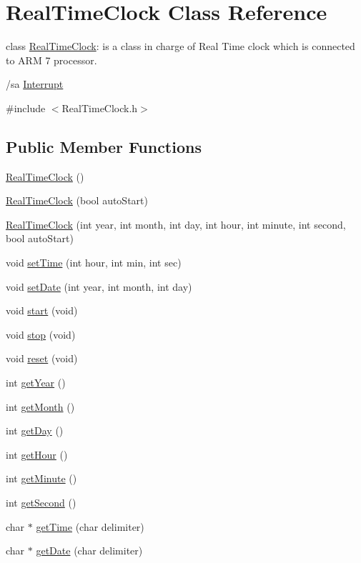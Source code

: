 \hypertarget{class_real_time_clock}{
\section{RealTimeClock Class Reference}
\label{class_real_time_clock}
}


class \hyperlink{class_real_time_clock}{RealTimeClock}: is a class in charge of Real Time clock which is connected to ARM 7 processor.

/sa \hyperlink{class_interrupt}{Interrupt}  




{\ttfamily \#include $<$RealTimeClock.h$>$}

\subsection*{Public Member Functions}
\begin{DoxyCompactItemize}
\item 
\hyperlink{class_real_time_clock_ad4fb1eea4450089f13ae70650e5d2d1c}{RealTimeClock} ()
\item 
\hyperlink{group__group9_ga02c3e799d7541e2917ef46e71146ed90}{RealTimeClock} (bool autoStart)
\item 
\hyperlink{group__group9_gaad2bfb64a40a2a2729b569c08e7dcc49}{RealTimeClock} (int year, int month, int day, int hour, int minute, int second, bool autoStart)
\item 
void \hyperlink{group__group9_ga14ecce7648b24c7a85359af3f5b20af6}{setTime} (int hour, int min, int sec)
\item 
void \hyperlink{group__group9_ga4a5781efbfce128e0d3c461627ce371b}{setDate} (int year, int month, int day)
\item 
void \hyperlink{group__group9_gab62814ef94d0fe081e1f8a2756317a3c}{start} (void)
\item 
void \hyperlink{group__group9_ga116ebd0f42df71ef71d217527194d867}{stop} (void)
\item 
void \hyperlink{group__group9_ga81b09971229ddc88a7581bf5dcab7d1e}{reset} (void)
\item 
int \hyperlink{group__group9_ga58d426541706593b83016e0462e41625}{getYear} ()
\item 
int \hyperlink{group__group9_gaa8901871334c623b9473216de08c1432}{getMonth} ()
\item 
int \hyperlink{group__group9_ga29dbb224e31f5dca34c29e5e48ebeb2c}{getDay} ()
\item 
int \hyperlink{group__group9_ga86c10ef9f4da8dbee7fbd6236443fd53}{getHour} ()
\item 
int \hyperlink{group__group9_ga9784205a5ea194cca976af6cfee1308b}{getMinute} ()
\item 
int \hyperlink{group__group9_gaaddd01287cb8a6d2711b0650f7cbcc72}{getSecond} ()
\item 
char $\ast$ \hyperlink{group__group9_gaad4ca0e261b2a594e536303dee1116f4}{getTime} (char delimiter)
\item 
char $\ast$ \hyperlink{group__group9_gaa11261523ee392adf9081def9e3b1fcd}{getDate} (char delimiter)
\end{DoxyCompactItemize}


